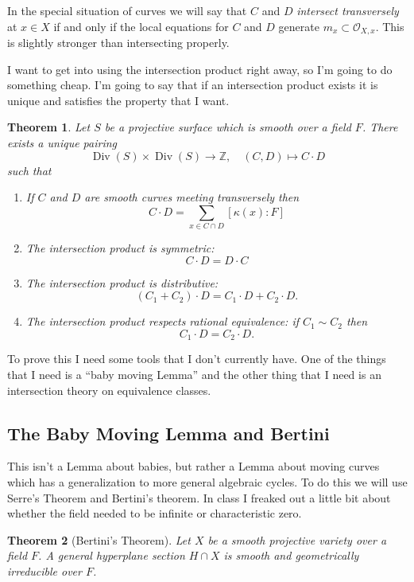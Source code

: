 \documentclass[12pt]{article}
\numberwithin{equation}{section}
\newtheorem{theorem}{Theorem}[subsection]
\theoremstyle{definition}
\theoremstyle{remark}
\newcommand{\ZZ}{\mathbb{Z}}
\newcommand{\Ocal}{\mathcal{O}}
\newcommand{\Div}{\operatorname{Div}}
\begin{document}
In the special situation of curves we will say that $C$ and $D$ \emph{intersect transversely} at $x\in X$ if and only if the local equations for $C$ and $D$ generate $m_x \subset \Ocal_{X,x}$.
This is slightly stronger than intersecting properly. 

I want to get into using the intersection product right away, so I'm going to do something cheap. 
I'm going to say that if an intersection product exists it is unique and satisfies the property that I want. 
\begin{theorem}
	Let $S$ be a projective surface which is smooth over a field $F$.  
	There exists a unique pairing 
	$$\Div(S)\times\Div(S) \to \ZZ, \quad (C,D) \mapsto C\cdot D$$
	such that
	\begin{enumerate}
		\item If $C$ and $D$ are smooth curves meeting transversely then 
		$$C\cdot D = \sum_{x \in C\cap D} [\kappa(x):F]$$
		\item The intersection product is symmetric:
		$$C\cdot D = D\cdot C$$
		\item The intersection product is distributive: 
		$$(C_1+C_2)\cdot D = C_1 \cdot D + C_2\cdot D.$$
		\item The intersection product respects rational equivalence:
		if $C_1 \sim C_2$ then 
		$$C_1 \cdot D = C_2 \cdot D.$$ 
	\end{enumerate}
\end{theorem}

To prove this I need some tools that I don't currently have.
One of the things that I need is a ``baby moving Lemma'' and the other thing that I need is an intersection theory on equivalence classes. 

\subsection{The Baby Moving Lemma and Bertini}
This isn't a Lemma about babies, but rather a Lemma about moving curves which has a generalization to more general algebraic cycles. 
To do this we will use Serre's Theorem and Bertini's theorem. 
In class I freaked out a little bit about whether the field needed to be infinite or characteristic zero. 

\begin{theorem}[Bertini's Theorem]
	Let $X$ be a smooth projective variety over a field $F$. 
	A general hyperplane section $H\cap X$ is smooth and geometrically irreducible over $F$. 
\end{theorem}
\end{document}
